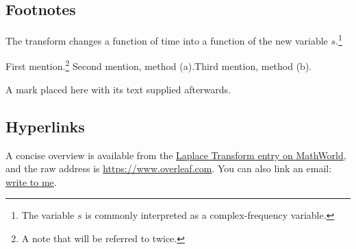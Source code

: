 \documentclass[11pt,a4paper]{article}
\theoremstyle{definition}                   %
\begin{document}

\subsection{Footnotes}
The transform changes a function of time into a function of the new variable
$s$.\footnote{The variable $s$ is commonly interpreted as a complex-frequency
variable.}

First mention.\footnote{\label{fn:tool}A note that will be referred to twice.}
\setcounter{savedfn}{\value{footnote}}
Second mention, method (a).\footnotemark[\thesavedfn]
Third mention, method (b).

A mark placed here\footnotemark{} with its text supplied afterwards.

\subsection{Hyperlinks}
A concise overview is available from the
\href{https://mathworld.wolfram.com/LaplaceTransform.html}{Laplace Transform
entry on MathWorld}, and the raw address is \url{https://www.overleaf.com}.
You can also link an email: \href{mailto:someone@example.com}{write to me}.


\end{document}
